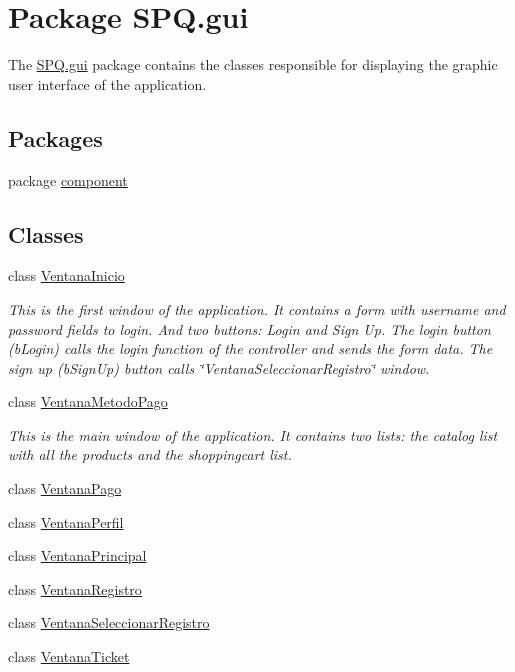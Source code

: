 \hypertarget{namespace_s_p_q_1_1gui}{}\section{Package S\+P\+Q.\+gui}
\label{namespace_s_p_q_1_1gui}


The \mbox{\hyperlink{namespace_s_p_q_1_1gui}{S\+P\+Q.\+gui}} package contains the classes responsible for displaying the graphic user interface of the application.  


\subsection*{Packages}
\begin{DoxyCompactItemize}
\item 
package \mbox{\hyperlink{namespace_s_p_q_1_1gui_1_1component}{component}}
\end{DoxyCompactItemize}
\subsection*{Classes}
\begin{DoxyCompactItemize}
\item 
class \mbox{\hyperlink{class_s_p_q_1_1gui_1_1_ventana_inicio}{Ventana\+Inicio}}
\begin{DoxyCompactList}\small\item\em This is the first window of the application. It contains a form with username and password fields to login. And two buttons\+: Login and Sign Up. The login button (b\+Login) calls the login function of the controller and sends the form data. The sign up (b\+Sign\+Up) button calls \char`\"{}\+Ventana\+Seleccionar\+Registro\char`\"{} window. \end{DoxyCompactList}\item 
class \mbox{\hyperlink{class_s_p_q_1_1gui_1_1_ventana_metodo_pago}{Ventana\+Metodo\+Pago}}
\begin{DoxyCompactList}\small\item\em This is the main window of the application. It contains two lists\+: the catalog list with all the products and the shoppingcart list. \end{DoxyCompactList}\item 
class \mbox{\hyperlink{class_s_p_q_1_1gui_1_1_ventana_pago}{Ventana\+Pago}}
\item 
class \mbox{\hyperlink{class_s_p_q_1_1gui_1_1_ventana_perfil}{Ventana\+Perfil}}
\item 
class \mbox{\hyperlink{class_s_p_q_1_1gui_1_1_ventana_principal}{Ventana\+Principal}}
\item 
class \mbox{\hyperlink{class_s_p_q_1_1gui_1_1_ventana_registro}{Ventana\+Registro}}
\item 
class \mbox{\hyperlink{class_s_p_q_1_1gui_1_1_ventana_seleccionar_registro}{Ventana\+Seleccionar\+Registro}}
\item 
class \mbox{\hyperlink{class_s_p_q_1_1gui_1_1_ventana_ticket}{Ventana\+Ticket}}
\end{DoxyCompactItemize}


